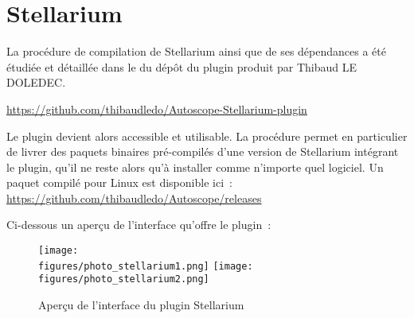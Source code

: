 \section{Stellarium}

La procédure de compilation de Stellarium ainsi que de ses dépendances a été étudiée et détaillée dans le  du dépôt du plugin produit par Thibaud LE DOLEDEC.

\url{https://github.com/thibaudledo/Autoscope-Stellarium-plugin}

\vspace{1cm}

Le plugin devient alors accessible et utilisable. La procédure permet en particulier de livrer des paquets binaires pré-compilés d'une version de Stellarium intégrant le plugin, qu'il ne reste alors qu'à installer comme n'importe quel logiciel. Un paquet compilé pour Linux est disponible ici~: \url{https://github.com/thibaudledo/Autoscope/releases}

\vspace{1cm}

Ci-dessous un aperçu de l'interface qu'offre le plugin~:

\begin{figure}[H]
    \centering
	\texttt{[image: \\figures/photo\_stellarium1.png]}
	\texttt{[image: \\figures/photo\_stellarium2.png]}
    \decoRule
    \caption[
    Aperçu de l'interface du plugin Stellarium]{
    Aperçu de l'interface du plugin Stellarium}
    \label{fig:Aperçu de l'interface du plugin Stellarium}
    \end{figure}
